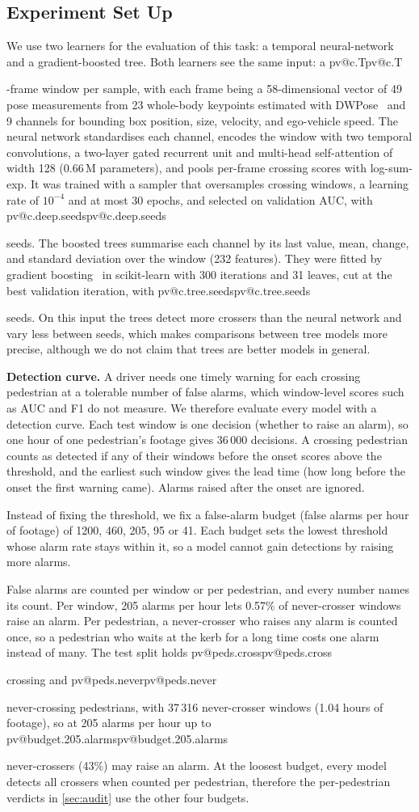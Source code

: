 \documentclass[10pt,a4paper,twocolumn]{article}
\makeatletter
\newcommand{\V}[1]{\ifcsname pv@#1\endcsname\csname pv@#1\endcsname\else
  \PackageError{numbers}{Unknown number key: #1}{Run figures/make_tables.py}\fi}
\makeatother
\begin{document}
\subsection{Experiment Set Up}
\label{sec:setup}
We use two learners for the evaluation of this task: a temporal
neural-network and a gradient-boosted tree. Both learners see the same input:
a \V{c.T}-frame window per sample, with each frame being a 58-dimensional
vector of 49 pose measurements from 23 whole-body keypoints estimated with
DWPose~\cite{yang2023dwpose} and 9 channels for bounding box position, size,
velocity, and ego-vehicle speed. The neural network standardises each channel,
encodes the window with two temporal convolutions, a two-layer gated recurrent
unit and multi-head self-attention of width 128 (0.66\,M parameters), and
pools per-frame crossing scores with log-sum-exp. It was trained with a
sampler that oversamples crossing windows, a learning rate of $10^{-4}$ and at
most 30 epochs, and selected on validation AUC, with \V{c.deep.seeds} seeds.
The boosted trees summarise each channel by its last value, mean, change, and
standard deviation over the window (232 features). They were fitted by
gradient boosting~\cite{friedman2001greedy} in scikit-learn with 300
iterations and 31 leaves, cut at the best validation iteration, with
\V{c.tree.seeds} seeds. On this input the trees detect more crossers than the
neural network and vary less between seeds, which makes comparisons between
tree models more precise, although we do not claim that trees are better
models in general.

\textbf{Detection curve.} A driver needs one timely warning for each crossing
pedestrian at a tolerable number of false alarms, which window-level scores
such as AUC and F1 do not measure. We therefore evaluate every model with a
detection curve. Each test window is one decision (whether to raise an alarm),
so one hour of one pedestrian's footage gives 36\,000 decisions. A crossing
pedestrian counts as detected if any of their windows before the onset scores
above the threshold, and the earliest such window gives the lead time (how
long before the onset the first warning came). Alarms raised after the onset
are ignored.

Instead of fixing the threshold, we fix a false-alarm budget (false alarms per
hour of footage) of 1200, 460, 205, 95 or 41. Each budget sets the lowest threshold whose
alarm rate stays within it, so a model cannot gain detections by raising more
alarms.

False alarms are counted per window or per pedestrian, and every number names
its count. Per window, 205 alarms per hour lets 0.57\% of never-crosser
windows raise an alarm. Per pedestrian, a never-crosser who raises any alarm
is counted once, so a pedestrian who waits at the kerb for a long time costs
one alarm instead of many. The test split holds \V{peds.cross} crossing and
\V{peds.never} never-crossing pedestrians, with 37\,316 never-crosser windows
(1.04 hours of footage), so at 205 alarms per hour up to
\V{budget.205.alarms} never-crossers (43\%) may raise an alarm. At the
loosest budget, every model detects all crossers when counted per pedestrian,
therefore the per-pedestrian verdicts in \cref{sec:audit} use the other four
budgets.
\end{document}
